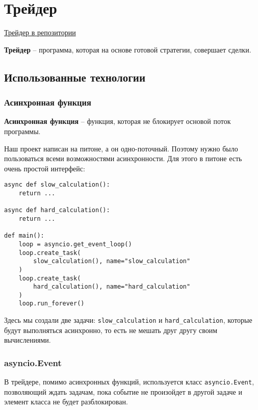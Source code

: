\section{Трейдер}

\href{https://github.com/dexety/dex-trading-system/blob/main/strategy/arbitrage/trader.py}{Трейдер в репозитории}

\begin{definition}
\textbf{Трейдер} -- программа, которая на основе готовой стратегии, совершает сделки.
\end{definition}

\subsection{Использованные технологии}

\subsubsection{Асинхронная функция}

\begin{definition}
\textbf{Асинхронная функция} -- функция, которая не блокирует основой поток программы.
\end{definition}

Наш проект написан на питоне, а он одно-поточный. Поэтому нужно было пользоваться всеми возможностями асинхронности. Для этого в питоне есть очень простой интерфейс:

\begin{verbatim}
async def slow_calculation():
    return ...
    
async def hard_calculation():
    return ...
    
def main():
    loop = asyncio.get_event_loop()
    loop.create_task(
        slow_calculation(), name="slow_calculation"
    )
    loop.create_task(
        hard_calculation(), name="hard_calculation"
    )
    loop.run_forever()
\end{verbatim}

Здесь мы создали две задачи: \texttt{slow\_calculation} и  \texttt{hard\_calculation}, которые будут выполняться асинхронно, то есть не мешать друг другу своим вычислениями.

\subsubsection{asyncio.Event}

В трейдере, помимо асинхронных функций, используется класс \texttt{asyncio.Event}, позволяющий ждать задачам, пока событие не произойдет в другой задаче и элемент класса не будет разблокирован.


